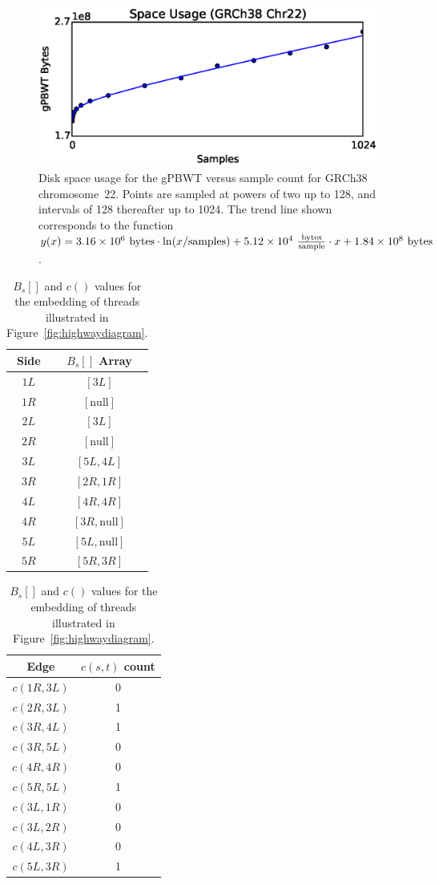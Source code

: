 \begin{figure}[h!]
\centering
\includegraphics[width=\linewidth]{figures/03_gpbwt/scaling.eps}
\caption{Disk space usage for the gPBWT versus sample count for GRCh38 chromosome~22. Points are sampled at powers of two up to 128, and intervals of 128 thereafter up to 1024. The trend line shown corresponds to the function $y(x) = \num{3.16E6}~\mathrm{bytes} \cdot \ln(x / \mathrm{samples}) + \num{5.12E4}~\frac{\mathrm{bytes}}{\mathrm{sample}} \cdot x + \num{1.84E8}~\mathrm{bytes}$.}
\label{fig:scaling}
\end{figure}

\begin{table}[h!]
\caption{$B_s[]$ and $c()$ values for the embedding of threads illustrated in Figure~\ref{fig:highwaydiagram}.}
\label{tbl:barrays}
\centering
\begin{tabular} { c | c }
Side & $B_s[]$ Array \\
\hline
$1L$ & $[3L]$ \\
$1R$ & $[\mathrm{null}]$ \\
$2L$ & $[3L]$ \\
$2R$ & $[\mathrm{null}]$ \\
$3L$ & $[5L, 4L]$ \\
$3R$ & $[2R, 1R]$ \\
$4L$ & $[4R, 4R]$ \\
$4R$ & $[3R, \mathrm{null}]$ \\
$5L$ & $[5L, \mathrm{null}]$ \\
$5R$ & $[5R, 3R]$ \\
\end{tabular}
\begin{tabular}{ c | c }
Edge & $c(s, t)$ count \\
\hline
$c(1R, 3L)$ & 0 \\
$c(2R, 3L)$ & 1 \\
$c(3R, 4L)$ & 1 \\
$c(3R, 5L)$ & 0 \\
$c(4R, 4R)$ & 0 \\
$c(5R, 5L)$ & 1 \\
$c(3L, 1R)$ & 0 \\
$c(3L, 2R)$ & 0 \\
$c(4L, 3R)$ & 0 \\
$c(5L, 3R)$ & 1 \\
\end{tabular}

\end{table}

